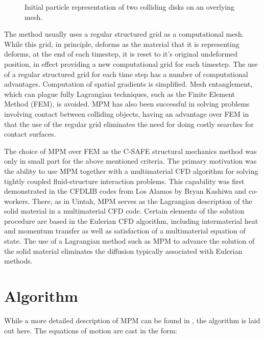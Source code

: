\begin{figure}[h]
  \hspace{1.5in}
  \caption{\label{fig-disks_init} Initial particle representation of two
                                colliding disks on an overlying mesh.}
\end{figure}

The method usually uses a regular structured grid as a 
computational mesh.
While this grid, in principle, deforms as the material that it 
is representing
deforms, at the end of each timestep, it is reset to it's 
original undeformed
position, in effect providing a new computational grid for each 
timestep.
The use of a regular structured grid for each time step has a 
number of
computational advantages.  Computation of spatial gradients is 
simplified.
Mesh entanglement, which can plague fully Lagrangian techniques, 
such as
the Finite Element Method (FEM), is avoided.  MPM has also been 
successful
in solving problems involving contact between colliding objects, 
having an
advantage over FEM in that the use of the regular grid 
eliminates the
need for doing costly searches for contact surfaces\cite{bard}.

The choice of MPM over FEM as the C-SAFE structural mechanics method
was only in small part for the above mentioned criteria.  The
primary motivation was the ability to use MPM together with a multimaterial
CFD algorithm for solving tightly coupled fluid-structure interaction
problems.  This capability was first demonstrated in the CFDLIB
codes from Los Alamos by Bryan Kashiwa and co-workers.  There, as
in Uintah, MPM serves as the Lagrangian description of the solid
material in a multimaterial CFD code.  Certain elements of the
solution procedure are based in the Eulerian CFD algorithm, including
intermaterial heat and momentum transfer as well as satisfaction
of a multimaterial equation of state.  The use of a Lagrangian method
such as MPM to advance the solution of the solid material eliminates
the diffusion typically associated with Eulerian methods.

\section{Algorithm}

While a more detailed description of MPM can be found in 
\cite{sulskycpc},
the algorithm is laid out here.  The equations of motion are 
cast in the
form:

